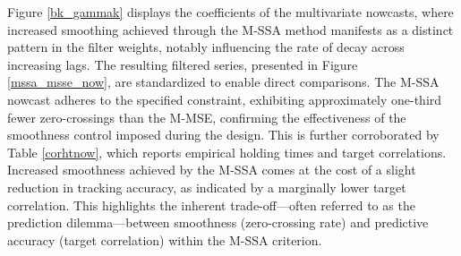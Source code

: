 \documentclass[a4paper]{article}
\begin{document}
Figure \ref{bk_gammak} displays the coefficients of the multivariate nowcasts, where increased smoothing achieved through the M-SSA method manifests as a distinct pattern in the filter weights, notably influencing the rate of decay across increasing lags. The resulting filtered series, presented in Figure \ref{mssa_msse_now}, are standardized to enable direct comparisons. The M-SSA nowcast adheres to the specified constraint, exhibiting approximately one-third fewer zero-crossings than the M-MSE, confirming the effectiveness of the smoothness control imposed during the design. This is further corroborated by Table \ref{corhtnow}, which reports empirical holding times and target correlations. Increased smoothness achieved by the M-SSA comes at the cost of a slight reduction in tracking accuracy, as indicated by a marginally lower target correlation. This highlights the inherent trade-off—often referred to as the prediction dilemma—between smoothness (zero-crossing rate) and predictive accuracy (target correlation) within the M-SSA criterion.
\end{document}

